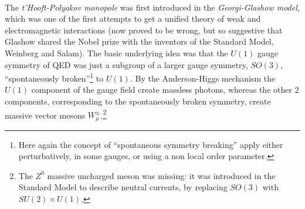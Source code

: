 \documentclass[../main/main.tex]{subfiles}
\begin{document}
\cite[Chapter 4]{Shifman:2012}\\

The \emph{t'Hooft-Polyakov monopole} was first introduced in the \emph{Georgi-Glashow model}, which was one of the first attempts to get a unified theory of weak and electromagnetic interactions (now proved to be wrong, but so suggestive that Glashow shared the Nobel prize with the inventors of the Standard Model, Weinberg and Salam). The basic underlying idea was that the $U(1)$ gauge symmetry of QED was just a subgroup of a larger gauge symmetry, $SO(3)$, ``spontaneously broken''\footnote{Here again the concept of ``spontaneous symmetry breaking'' apply either perturbatively, in some gauges, or using a non local order parameter.} to $U(1)$. By the Anderson-Higgs mechanism the $U(1)$ component of the gauge field create massless photons, whereas the other 2 components, corresponding to the spontaneously broken symmetry, create massive vector mesons $W_\mu^\pm$.\footnote{The $Z^0$ massive uncharged meson was missing: it was introduced in the Standard Model to describe neutral currents, by replacing $SO(3)$ with $SU(2)\times U(1)$.} 


\skipline
\end{document}
